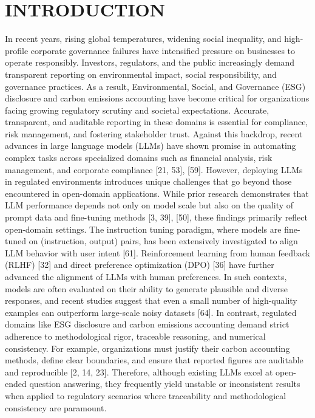 \documentclass[9pt,twocolumn]{extarticle}
\begin{document}
\section{INTRODUCTION}
In recent years, rising global temperatures, widening social inequality,
and high-profile corporate governance failures have intensified pressure
on businesses to operate responsibly. Investors, regulators, and the
public increasingly demand transparent reporting on environmental
impact, social responsibility, and governance practices. As a result,
Environmental, Social, and Governance (ESG) disclosure and carbon
emissions accounting have become critical for organizations facing
growing regulatory scrutiny and societal expectations. Accurate,
transparent, and auditable reporting in these domains is essential for
compliance, risk management, and fostering stakeholder trust. Against
this backdrop, recent advances in large language models (LLMs) have
shown promise in automating complex tasks across specialized domains
such as financial analysis, risk management, and corporate compliance
[21, 53],
[59]. However, deploying LLMs in regulated
environments introduces unique challenges that go beyond those
encountered in open-domain applications.
While prior research demonstrates that LLM performance depends not only
on model scale but also on the quality of prompt data and fine-tuning
methods [3, 39],
[50], these findings primarily reflect open-domain
settings. The instruction tuning paradigm, where models are fine-tuned
on (instruction, output) pairs, has been extensively investigated to
align LLM behavior with user intent [61].
Reinforcement learning from human feedback (RLHF)
[32] and direct preference optimization (DPO)
[36] have further advanced the alignment of LLMs
with human preferences. In such contexts, models are often evaluated on
their ability to generate plausible and diverse responses, and recent
studies suggest that even a small number of high-quality examples can
outperform large-scale noisy datasets [64]. In
contrast, regulated domains like ESG disclosure and carbon emissions
accounting demand strict adherence to methodological rigor, traceable
reasoning, and numerical consistency. For example, organizations must
justify their carbon accounting methods, define clear boundaries, and
ensure that reported figures are auditable and reproducible
[2, 14, 23].
Therefore, although existing LLMs excel at open-ended question
answering, they frequently yield unstable or inconsistent results when
applied to regulatory scenarios where traceability and methodological
consistency are paramount.
\end{document}
